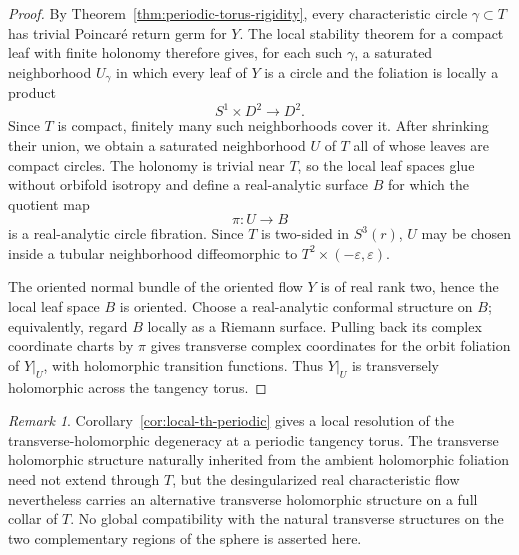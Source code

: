 \documentclass[11pt,reqno]{article}
\theoremstyle{remark}
\newtheorem*{remark}{Remark}
\begin{document}
\begin{proof}
By Theorem~\ref{thm:periodic-torus-rigidity}, every characteristic circle $\gamma\subset T$ has trivial Poincar\'e return germ for $Y$. The local stability theorem for a compact leaf with finite holonomy therefore gives, for each such $\gamma$, a saturated neighborhood $U_\gamma$ in which every leaf of $Y$ is a circle and the foliation is locally a product
\[
 S^1\times D^2\longrightarrow D^2.
\]
Since $T$ is compact, finitely many such neighborhoods cover it. After shrinking their union, we obtain a saturated neighborhood $U$ of $T$ all of whose leaves are compact circles. The holonomy is trivial near $T$, so the local leaf spaces glue without orbifold isotropy and define a real-analytic surface $B$ for which the quotient map
\[
 \pi:U\longrightarrow B
\]
is a real-analytic circle fibration. Since $T$ is two-sided in $S^3(r)$, $U$ may be chosen inside a tubular neighborhood diffeomorphic to $T^2\times(-\varepsilon,\varepsilon)$.

The oriented normal bundle of the oriented flow $Y$ is of real rank two, hence the local leaf space $B$ is oriented. Choose a real-analytic conformal structure on $B$; equivalently, regard $B$ locally as a Riemann surface. Pulling back its complex coordinate charts by $\pi$ gives transverse complex coordinates for the orbit foliation of $Y|_U$, with holomorphic transition functions. Thus $Y|_U$ is transversely holomorphic across the tangency torus.
\end{proof}

\begin{remark}\label{rem:periodic-local-model}
Corollary~\ref{cor:local-th-periodic} gives a local resolution of the transverse-holomorphic degeneracy at a periodic tangency torus. The transverse holomorphic structure naturally inherited from the ambient holomorphic foliation need not extend through $T$, but the desingularized real characteristic flow nevertheless carries an alternative transverse holomorphic structure on a full collar of $T$. No global compatibility with the natural transverse structures on the two complementary regions of the sphere is asserted here.
\end{remark}
\end{document}
